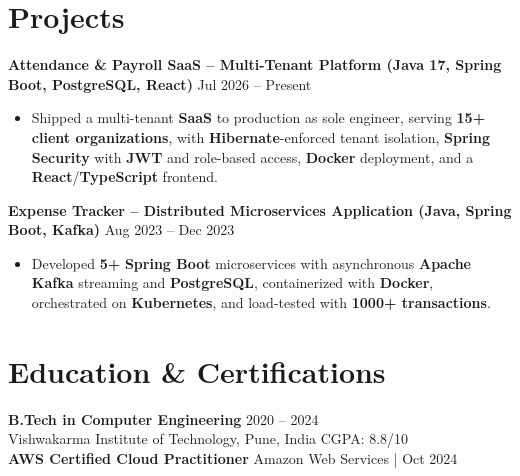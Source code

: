 \documentclass[a4paper,10pt]{article}
\begin{document}
\section*{Projects}

\textbf{Attendance \& Payroll SaaS -- Multi-Tenant Platform (Java 17, Spring Boot, PostgreSQL, React)} \hfill Jul 2026 -- Present
\begin{itemize}[leftmargin=*]
    \item Shipped a multi-tenant \textbf{SaaS} to production as sole engineer, serving \textbf{15+ client organizations}, with \textbf{Hibernate}-enforced tenant isolation, \textbf{Spring Security} with \textbf{JWT} and role-based access, \textbf{Docker} deployment, and a \textbf{React}/\textbf{TypeScript} frontend.
\end{itemize}

\textbf{Expense Tracker -- Distributed Microservices Application (Java, Spring Boot, Kafka)} \hfill Aug 2023 -- Dec 2023
\begin{itemize}[leftmargin=*]
    \item Developed \textbf{5+} \textbf{Spring Boot} microservices with asynchronous \textbf{Apache Kafka} streaming and \textbf{PostgreSQL}, containerized with \textbf{Docker}, orchestrated on \textbf{Kubernetes}, and load-tested with \textbf{1000+ transactions}.
\end{itemize}

\section*{Education \& Certifications}
\textbf{B.Tech in Computer Engineering} \hfill 2020 -- 2024 \\
Vishwakarma Institute of Technology, Pune, India \hfill CGPA: 8.8/10 \\
\textbf{AWS Certified Cloud Practitioner} \hfill Amazon Web Services \;|\; Oct 2024
\end{document}
